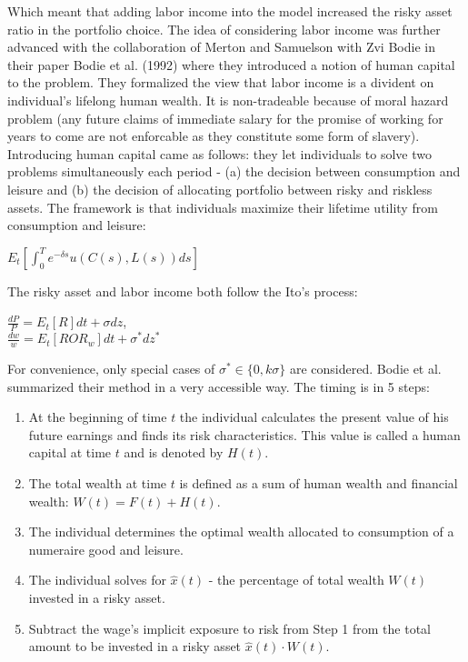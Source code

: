 Which meant that adding labor income into the model increased the risky asset ratio in the portfolio choice. The idea of considering labor income was further advanced with the collaboration of Merton and Samuelson with Zvi Bodie in their paper Bodie et al. (1992) where they introduced a notion of human capital to the problem. They formalized the view that labor income is a divident on individual's lifelong human wealth. It is non-tradeable because of moral hazard problem (any future claims of immediate salary for the promise of working for years to come are not enforcable as they constitute some form of slavery). Introducing human capital came as follows: they let individuals to solve two problems simultaneously each period - (a) the decision between consumption and leisure and (b) the decision of allocating portfolio between risky and riskless assets. The framework is that individuals maximize their lifetime utility from consumption and leisure:

\begin{center}
	$E_t \left[\displaystyle\int_0^T e^{-\delta s} u(C(s), L(s))ds \right]$
\end{center}

The risky asset and labor income both follow the Ito's process:

\begin{center}
	$\frac{dP}{P} = E_t[R]dt + \sigma dz$,\\
	$\frac{dw}{w} = E_t[ROR_w]dt + \sigma^* dz^*$
\end{center}

For convenience, only special cases of $\sigma^* \in \{0, k\sigma \}$ are considered. Bodie et al. summarized their method in a very accessible way. The timing is in 5 steps:

\begin{enumerate}
	\item At the beginning of time $t$ the individual calculates the present value of his future earnings and finds its risk characteristics. This value is called a human capital at time $t$ and is denoted by $H(t)$.
	\item The total wealth at time $t$ is defined as a sum of human wealth and financial wealth: $W(t) = F(t) + H(t)$.
	\item The individual determines the optimal wealth allocated to consumption of a numeraire good and leisure.
	\item The individual solves for $\hat{x}(t)$ - the percentage of total wealth $W(t)$ invested in a risky asset.
	\item Subtract the wage's implicit exposure to risk from Step 1 from the total amount to be invested in a risky asset $\hat{x}(t) \cdot W(t)$.
\end{enumerate}

